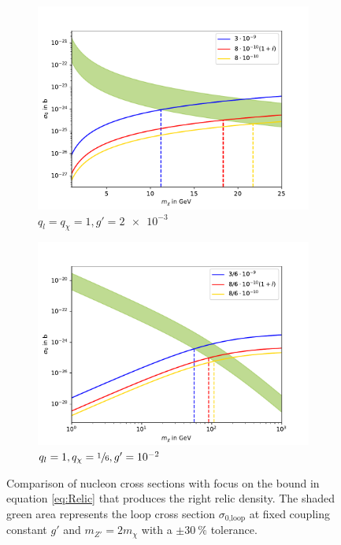 \begin{figure}
	\centering
	\begin{subfigure}[]{0.8\textwidth}
		\includegraphics[width=\textwidth]{content/graphics/Relic11.pdf}
		\caption{$q_l=q_\chi=1,g'=\SI{2e-3}{}$}
		\label{fig:Relic11}
	\end{subfigure}
	\begin{subfigure}[]{0.8\textwidth}
		\includegraphics[width=\textwidth]{content/graphics/Relic116.pdf}
		\caption{$q_l=1,q_\chi=\sfrac{1}{6},g'=\SI{e-2}{}$}
		\label{fig:Relic116}
	\end{subfigure}
	\caption{Comparison of nucleon cross sections with focus on the bound in equation \eqref{eq:Relic} that produces the right relic density. The shaded green area represents the loop cross section $\sigma_\text{0,loop}$ at fixed coupling constant $g'$ and \mbox{$m_{Z'} = 2m_\chi$} with a $\pm\SI{30}{\%}$ tolerance.}
	\label{fig:Relic}
\end{figure}

